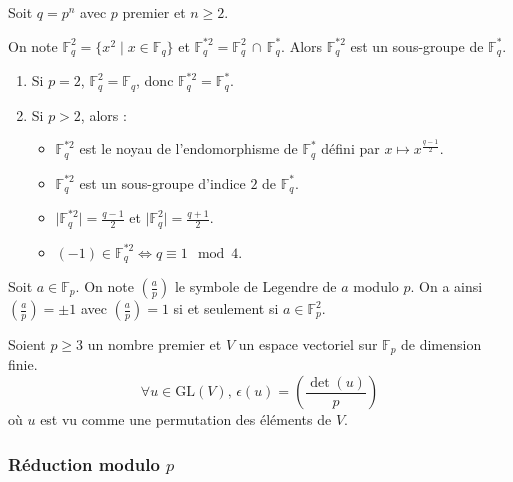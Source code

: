 
	Soit $q = p^n$ avec $p$ premier et $n \geq 2$.

	\begin{proposition}
		On note $\mathbb{F}_q^2 = \{ x^2 \mid x \in \mathbb{F}_q \}$ et $\mathbb{F}_q^{*2} = \mathbb{F}_q^2 \, \cap \, \mathbb{F}_q^*$. Alors $\mathbb{F}_q^{*2}$ est un sous-groupe de $\mathbb{F}_q^*$.
	\end{proposition}

	\begin{proposition}
		\begin{enumerate}[label=(\roman*)]
			\item Si $p = 2$, $\mathbb{F}_q^2 = \mathbb{F}_q$, donc $\mathbb{F}_q^{*2} = \mathbb{F}_q^*$.
			\item Si $p > 2$, alors :
			\begin{itemize}
				\item $\mathbb{F}_q^{*2}$ est le noyau de l'endomorphisme de $\mathbb{F}_q^*$ défini par $x \mapsto x^{\frac{q-1}{2}}$.
				\item $\mathbb{F}_q^{*2}$ est un sous-groupe d'indice $2$ de $\mathbb{F}_q^*$.
				\item $\vert \mathbb{F}_q^{*2} \vert = \frac{q-1}{2}$ et $\vert \mathbb{F}_q^2 \vert = \frac{q+1}{2}$.
				\item $(-1) \in \mathbb{F}_q^{*2} \iff q \equiv 1 \mod 4$.
			\end{itemize}
		\end{enumerate}
	\end{proposition}


	\begin{notation}
		Soit $a \in \mathbb{F}_p$. On note $\left( \frac{a}{p} \right)$ le symbole de Legendre de $a$ modulo $p$. On a ainsi $\left( \frac{a}{p} \right) = \pm 1$ avec $\left( \frac{a}{p} \right) = 1$ si et seulement si $a \in \mathbb{F}_p^2$.
	\end{notation}

	\begin{application}
		Soient $p \geq 3$ un nombre premier et $V$ un espace vectoriel sur $\mathbb{F}_p$ de dimension finie.
		\[ \forall u \in \mathrm{GL}(V), \, \epsilon(u) = \left( \frac{\det(u)}{p} \right) \]
		où $u$ est vu comme une permutation des éléments de $V$.
	\end{application}

	\subsubsection{Réduction modulo \texorpdfstring{$p$}{p}}

